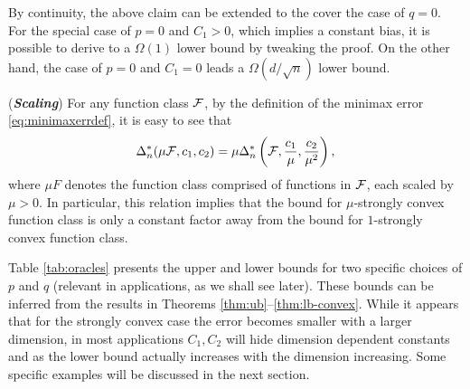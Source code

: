 By continuity, the above claim can be extended to the cover the case of $q=0$. For the special case of $p=0$ and $C_1>0$, which implies a constant bias, it is possible to derive to a $\Omega(1)$ lower bound by tweaking the proof. On the other hand, the case of $p=0$ and $C_1=0$ leads a $\Omega(d/\sqrt{n})$ lower bound.

\begin{remark}(\textbf{\textit{Scaling}})
For any function class $\mathcal{F}$, by the definition of the minimax error \eqref{eq:minimaxerrdef}, it is easy to see that
$$\Delta_n^*(\mu \mathcal{F}, c_1,c_2) = \mu \Delta_n^*\left(\mathcal{F}, \frac{c_1}{\mu},\frac{c_2}{\mu^2}\right),$$
 where $\mu F$ denotes the function class comprised of functions in $\mathcal{F}$, each scaled by $\mu>0$. In particular, this relation implies that the bound for $\mu$-strongly convex function class is only a constant factor away from the bound for $1$-strongly convex function class.
\end{remark}

Table \ref{tab:oracles} presents the upper and lower bounds for two specific choices of $p$ and $q$ (relevant in applications, as we shall see later). These bounds can be inferred from the results in Theorems \ref{thm:ub}--\ref{thm:lb-convex}.
While it appears that for the strongly convex case the error becomes smaller with a larger dimension,
in most applications $C_1, C_2$ will hide dimension dependent constants
and as the lower bound actually increases with the dimension increasing.
Some specific examples will be discussed in the next section.



